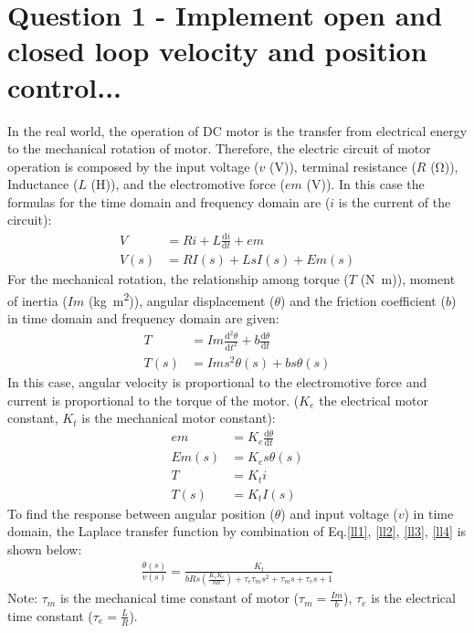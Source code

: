 \documentclass[conference]{IEEEtran}
\begin{document}
\section*{Question 1 - Implement open and closed loop velocity and position control...}
In the real world, the operation of DC motor is the transfer from electrical energy to the mechanical rotation of motor. Therefore, the electric circuit of motor operation is composed by the input voltage ($v$ (\si{\volt})), terminal resistance ($R$ (\si{\ohm})), Inductance ($L$ (\si{\henry})), and the electromotive force ($em$ (\si{\volt})). In this case the formulas for the time domain and frequency domain are ($i$ is the current of the circuit):
\begin{align}
    V &= Ri + L \frac{\textrm{d}i}{\textrm{d} t} + em\\
    V(s) &= RI(s) + LsI(s) + Em(s) \label{ll1}
\end{align}
For the mechanical rotation, the relationship among torque ($T$ (\si{\newton\metre})), moment of inertia ($Im$ (\si{\kg\metre\squared})), angular displacement ($\theta$) and the friction coefficient ($b$) in time domain and frequency domain are given:
\begin{align}
    T &= Im \frac{\textrm{d}^2 \theta}{\textrm{d} t^2} + b \frac{\textrm{d} \theta}{\textrm{d} t}\\
    T(s) &= Ims^2 \theta(s) + bs\theta(s)\label{ll2}
\end{align}
In this case, angular velocity is proportional to the electromotive force and current is proportional to the torque of the motor. ($K_e$ the electrical motor constant, $K_t$ is the mechanical motor constant):
\begin{align}
    em &= K_e \frac{\textrm{d} \theta}{\textrm{d} t}\\
    Em(s) &= K_e s \theta(s)\\ \label{ll3}
    T &= K_t i\\
    T(s) &= K_t I(s) \label{ll4}
\end{align}
To find the response between angular position ($\theta$) and input voltage ($v$) in time domain, the Laplace transfer function by combination of Eq.\ref{ll1}, \ref{ll2}, \ref{ll3}, \ref{ll4} is shown below:
\begin{align}
    \frac{\theta (s)}{v(s)} = \frac{K_t}{bRs (\frac{K_e K_t}{bR}) + \tau_e \tau_m s^2 + \tau_m s + \tau_e s +1}
\end{align}
Note: $\tau_m$ is the mechanical time constant of motor ($\tau_m=\frac{Im}{b}$), $\tau_e$ is the electrical time constant ($\tau_e=\frac{L}{R}$).
\end{document}
